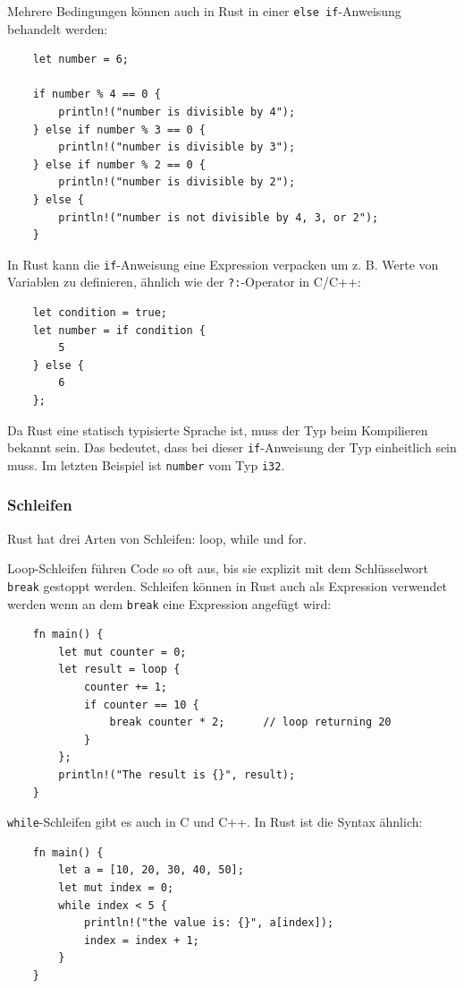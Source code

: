 Mehrere Bedingungen können auch in Rust in einer \verb"else if"-Anweisung behandelt werden:

\begin{lstlisting}
    let number = 6;

    if number % 4 == 0 {
        println!("number is divisible by 4");
    } else if number % 3 == 0 {
        println!("number is divisible by 3");
    } else if number % 2 == 0 {
        println!("number is divisible by 2");
    } else {
        println!("number is not divisible by 4, 3, or 2");
    }
\end{lstlisting}

In Rust kann die \verb"if"-Anweisung eine Expression verpacken um z. B. Werte von Variablen zu definieren, ähnlich wie der \verb"?:"-Operator in C/C++:

\begin{lstlisting}
    let condition = true;
    let number = if condition {
        5
    } else {
        6
    };
\end{lstlisting}

Da Rust eine statisch typisierte Sprache ist, muss der Typ beim Kompilieren bekannt sein. Das bedeutet, dass bei dieser \verb"if"-Anweisung der Typ einheitlich sein muss. Im letzten Beispiel ist \verb"number" vom Typ \verb"i32".

\subsubsection{Schleifen}

Rust hat drei Arten von Schleifen: loop, while und for.

Loop-Schleifen führen Code so oft aus, bis sie explizit mit dem Schlüsselwort \verb"break" gestoppt werden. Schleifen können in Rust auch als Expression verwendet werden wenn an dem \verb"break" eine Expression angefügt wird:

\begin{lstlisting}
    fn main() {
        let mut counter = 0;
        let result = loop {
            counter += 1;
            if counter == 10 {
                break counter * 2;      // loop returning 20
            }
        };
        println!("The result is {}", result);
    }
\end{lstlisting}

\verb"while"-Schleifen gibt es auch in C und C++. In Rust ist die Syntax ähnlich:

\begin{lstlisting}
    fn main() {
        let a = [10, 20, 30, 40, 50];
        let mut index = 0;
        while index < 5 {
            println!("the value is: {}", a[index]);
            index = index + 1;
        }
    }
\end{lstlisting}

